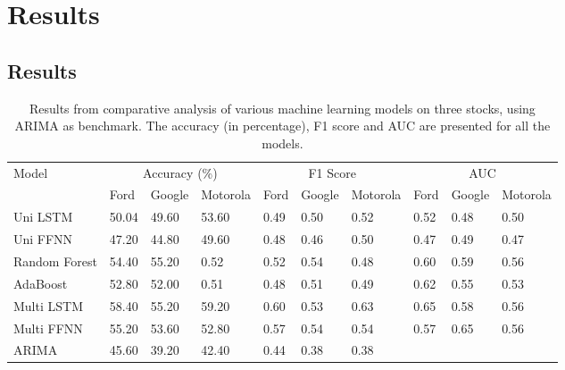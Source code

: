 
\chapter{Results} %

\label{Chapter6} %

\section{Results}


\begin{table}[h]
 \begin{adjustwidth}{-0.1cm}{}
\begin{tabular}{llllllllll}
\toprule
\multirow{2}{*}{Model} & \multicolumn{3}{c}{Accuracy (\%)} & \multicolumn{3}{c}{F1 Score} & \multicolumn{3}{c}{AUC}         \\
                       & Ford   & Google  & Motorola  & Ford   & Google  & Motorola  & Ford & Google & Motorola \\
                       \midrule
Uni LSTM        & 50.04   & 49.60    & 53.60     & 0.49  & 0.50   & 0.52     & 0.52       &  0.48      &    0.50      \\
Uni FFNN        & 47.20  & 44.80   & 49.60     & 0.48      &  0.46       &   0.50        &  0.47           &  0.49      & 0.47         \\
Random Forest          & 54.40  & 55.20   & 0.52     & 0.52      &   0.54      &   0.48        &   0.60          & 0.59       &  0.56        \\
AdaBoost               & 52.80     & 52.00   & 0.51     & 0.48      & 0.51  &    0.49       &    0.62         & 0.55       &  0.53        \\
Multi LSTM      & 58.40  & 55.20   & 59.20     & 0.60      & 0.53  & 0.63    & 0.65       &    0.58    &  0.56        \\
Multi FFNN      & 55.20  & 53.60   & 52.80     & 0.57      &   0.54      &     0.54      & 0.57            &  0.65      &  0.56        \\
ARIMA                  & 45.60  & 39.20    & 42.40     & 0.44      & 0.38        &  0.38         &             &        &     
 \end{tabular}
 \hline
 \quad
\caption{Results from comparative analysis of various machine learning models on three stocks, using ARIMA as benchmark. The accuracy (in percentage), F1 score and AUC are presented for all the models.}
 \end{adjustwidth}    
 \end{table}

